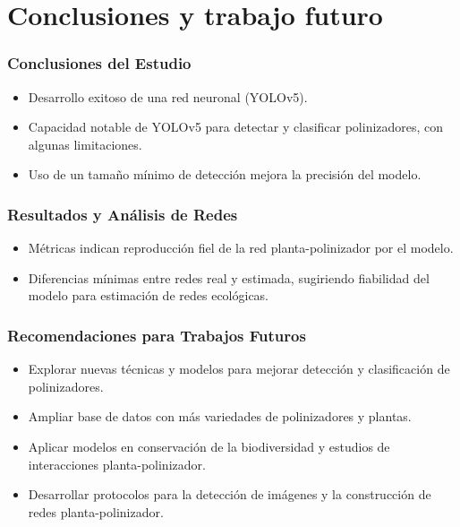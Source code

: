 \section{Conclusiones y trabajo futuro}


\begin{frame}
\frametitle{Conclusiones del Estudio}
\begin{itemize}
    \item Desarrollo exitoso de una red neuronal (YOLOv5).
    \item Capacidad notable de YOLOv5 para detectar y clasificar polinizadores, con algunas limitaciones.
    \item Uso de un tamaño mínimo de detección mejora la precisión del modelo.
\end{itemize}
\end{frame}

\begin{frame}
    \frametitle{Resultados y Análisis de Redes}
    \begin{itemize}
        \item Métricas indican reproducción fiel de la red planta-polinizador por el modelo.
        \item Diferencias mínimas entre redes real y estimada, sugiriendo fiabilidad del modelo para estimación de redes ecológicas.
    \end{itemize}
\end{frame}    

\begin{frame}
    \frametitle{Recomendaciones para Trabajos Futuros}
    \begin{itemize}
        \item Explorar nuevas técnicas y modelos para mejorar detección y clasificación de polinizadores.
        \item Ampliar base de datos con más variedades de polinizadores y plantas.
        \item Aplicar modelos en conservación de la biodiversidad y estudios de interacciones planta-polinizador.
        \item Desarrollar protocolos para la detección de imágenes y la construcción de redes planta-polinizador.
    \end{itemize}
    \end{frame}
    

